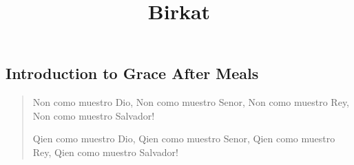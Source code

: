 ﻿\documentclass[a5paper, 12pt]{Birchon}
\title{Birkat}
\begin{document}
\begin{english}
\section*{Introduction to Grace After Meals}
\begin{verse}
Non como muestro Dio, Non como muestro Senor,
Non como muestro Rey, Non como muestro Salvador!

Qien como muestro Dio, Qien como muestro Senor,
Qien como muestro Rey, Qien como muestro Salvador!

\end{verse}
\end{english}

\eject

{}
{}

\eject
\end{document}
